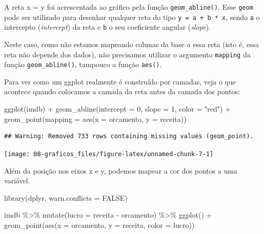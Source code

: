 \documentclass[
]{book}
\newenvironment{Shaded}{\begin{snugshade}}{\end{snugshade}}
\newcommand{\AttributeTok}[1]{\textcolor[rgb]{0.77,0.63,0.00}{#1}}
\newcommand{\ConstantTok}[1]{\textcolor[rgb]{0.00,0.00,0.00}{#1}}
\newcommand{\DecValTok}[1]{\textcolor[rgb]{0.00,0.00,0.81}{#1}}
\newcommand{\FunctionTok}[1]{\textcolor[rgb]{0.00,0.00,0.00}{#1}}
\newcommand{\NormalTok}[1]{#1}
\newcommand{\SpecialCharTok}[1]{\textcolor[rgb]{0.00,0.00,0.00}{#1}}
\newcommand{\StringTok}[1]{\textcolor[rgb]{0.31,0.60,0.02}{#1}}
\begin{document}
A reta x = y foi acrescentada ao gráfico pela função \texttt{geom\_abline()}. Esse \texttt{geom} pode ser utilizado para desenhar qualquer reta do tipo \texttt{y\ =\ a\ +\ b\ *\ x}, sendo \texttt{a} o intercepto (\emph{intercept}) da reta e \texttt{b} o seu coeficiente angular (\emph{slope}).

Neste caso, como não estamos mapeando colunas da base a essa reta (isto é, essa reta não depende dos dados), não precisamos utilizar o argumento \texttt{mapping} da função \texttt{geom\_abline()}, tampouco a função \texttt{aes()}.

Para ver como um ggplot realmente é construído por camadas, veja o que acontece quando colocamos a camada da reta antes da camada dos pontos:

\begin{Shaded}
\begin{Highlighting}[]
\FunctionTok{ggplot}\NormalTok{(imdb) }\SpecialCharTok{+}
  \FunctionTok{geom\_abline}\NormalTok{(}\AttributeTok{intercept =} \DecValTok{0}\NormalTok{, }\AttributeTok{slope =} \DecValTok{1}\NormalTok{, }\AttributeTok{color =} \StringTok{"red"}\NormalTok{) }\SpecialCharTok{+}
  \FunctionTok{geom\_point}\NormalTok{(}\AttributeTok{mapping =} \FunctionTok{aes}\NormalTok{(}\AttributeTok{x =}\NormalTok{ orcamento, }\AttributeTok{y =}\NormalTok{ receita)) }
\end{Highlighting}
\end{Shaded}

\begin{verbatim}
## Warning: Removed 733 rows containing missing values (geom_point).
\end{verbatim}

\begin{center}\texttt{[image: 08-graficos\_files/figure-latex/unnamed-chunk-7-1]} \end{center}

Além da posição nos eixos x e y, podemos mapear a cor dos pontos a uma variável.

\begin{Shaded}
\begin{Highlighting}[]
\FunctionTok{library}\NormalTok{(dplyr, }\AttributeTok{warn.conflicts =} \ConstantTok{FALSE}\NormalTok{)}

\NormalTok{imdb }\SpecialCharTok{\%\textgreater{}\%}
  \FunctionTok{mutate}\NormalTok{(}\AttributeTok{lucro =}\NormalTok{ receita }\SpecialCharTok{{-}}\NormalTok{ orcamento) }\SpecialCharTok{\%\textgreater{}\%} 
  \FunctionTok{ggplot}\NormalTok{() }\SpecialCharTok{+}
  \FunctionTok{geom\_point}\NormalTok{(}\FunctionTok{aes}\NormalTok{(}\AttributeTok{x =}\NormalTok{ orcamento, }\AttributeTok{y =}\NormalTok{ receita, }\AttributeTok{color =}\NormalTok{ lucro))}
\end{Highlighting}
\end{Shaded}
\end{document}
